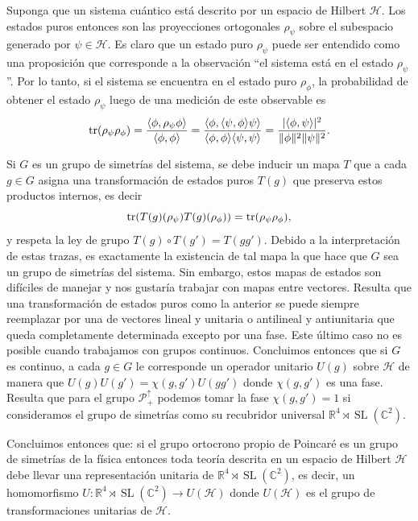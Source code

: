 \documentclass[11pt]{article}
\DeclareMathOperator{\Sl}{SL}
\begin{document}
Suponga que un sistema cuántico está descrito por un espacio de Hilbert $\mathcal{H}$. Los estados puros entonces son las proyecciones ortogonales $\rho_\psi$ sobre el subespacio generado por $\psi\in\mathcal{H}$. Es claro que un estado puro $\rho_\psi$ puede ser entendido como una proposición que corresponde a la observación ``el sistema está en el estado $\rho_\psi$''. Por lo tanto, si el sistema se encuentra en el estado puro $\rho_\phi$, la probabilidad de obtener el estado $\rho_\psi$ luego de una medición de este observable es
\begin{equation}
\tr(\rho_\psi\rho_\phi)=\frac{\langle\phi,\rho_\psi\phi\rangle}{\langle\phi,\phi\rangle}=\frac{\langle\phi,\langle\psi,\phi\rangle\psi\rangle}{\langle \phi,\phi\rangle\langle\psi,\psi\rangle}=\frac{|\langle\phi,\psi\rangle|^2}{\|\phi\|^2\|\psi\|^2}.
\end{equation}

Si $G$ es un grupo de simetrías del sistema, se debe inducir un mapa $T$ que a cada $g\in G$ asigna una transformación de estados puros $T(g)$ que preserva estos productos internos, es decir
\begin{equation}
\tr(T(g)(\rho_\psi)T(g)(\rho_\phi))=\tr(\rho_\psi\rho_\phi),
\end{equation} 
y respeta la ley de grupo $T(g)\circ T(g')=T(gg')$. Debido a la interpretación de estas trazas, es exactamente la existencia de tal mapa la que hace que $G$ sea un grupo de simetrías del sistema. Sin embargo, estos mapas de estados son difíciles de manejar y nos gustaría trabajar con mapas entre vectores. Resulta que una transformación de estados puros como la anterior se puede siempre reemplazar por una de vectores lineal y unitaria o antilineal y antiunitaria que queda completamente determinada excepto por una fase\cite{Haag1992}. Este último caso no es posible cuando trabajamos con grupos continuos. Concluimos entonces que si $G$ es continuo, a cada $g\in G$ le corresponde un operador unitario $U(g)$ sobre $\mathcal{H}$ de manera que $U(g)U(g')=\chi(g,g')U(gg')$ donde $\chi(g,g')$ es una fase. Resulta que para el grupo $\mathcal{P}_+^\uparrow$ podemos tomar la fase $\chi(g,g')=1$ si consideramos el grupo de simetrías como su recubridor universal $\mathbb{R}^4\rtimes\Sl(\mathbb{C}^2)$\cite{Haag1992}. 

Concluimos entonces que: si el grupo ortocrono propio de Poincaré es un grupo de simetrías de la física entonces toda teoría descrita en un espacio de Hilbert $\mathcal{H}$ debe llevar una representación unitaria de $\mathbb{R}^4\rtimes\Sl(\mathbb{C}^2)$, es decir, un homomorfismo $U:\mathbb{R}^4\rtimes\Sl(\mathbb{C}^2)\rightarrow U(\mathcal{H})$ donde $U(\mathcal{H})$ es el grupo de transformaciones unitarias de $\mathcal{H}$.
\end{document}
